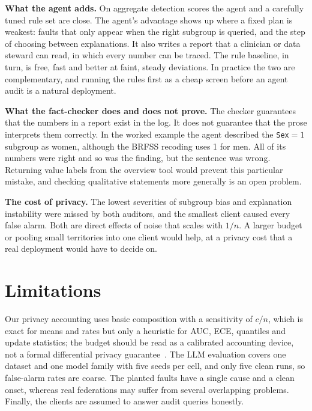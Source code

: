 \documentclass[conference]{IEEEtran}
\begin{document}
\textbf{What the agent adds.} On aggregate detection scores the agent and a carefully tuned rule
set are close. The agent's advantage shows up where a fixed plan is weakest: faults that only appear
when the right subgroup is queried, and the step of choosing between explanations. It also writes a
report that a clinician or data steward can read, in which every number can be traced. The rule
baseline, in turn, is free, fast and better at faint, steady deviations. In practice the two are
complementary, and running the rules first as a cheap screen before an agent audit is a natural
deployment.

\textbf{What the fact-checker does and does not prove.} The checker guarantees that the numbers in
a report exist in the log. It does not guarantee that the prose interprets them correctly. In the
worked example the agent described the \texttt{Sex}$=1$ subgroup as women, although the BRFSS
recoding uses 1 for men. All of its numbers were right and so was the finding, but the sentence was
wrong. Returning value labels from the overview tool would prevent this particular mistake, and
checking qualitative statements more generally is an open problem.

\textbf{The cost of privacy.} The lowest severities of subgroup bias and explanation instability
were missed by both auditors, and the smallest client caused every false alarm. Both are direct
effects of noise that scales with $1/n$. A larger budget or pooling small territories into one
client would help, at a privacy cost that a real deployment would have to decide on.

\section{Limitations}

Our privacy accounting uses basic composition with a sensitivity of $c/n$, which is exact for means
and rates but only a heuristic for AUC, ECE, quantiles and update statistics; the budget should be
read as a calibrated accounting device, not a formal differential privacy
guarantee~\cite{dwork2014algorithmic,abadi2016dpsgd}. The LLM evaluation covers one dataset and one
model family with five seeds per cell, and only five clean runs, so false-alarm rates are coarse.
The planted faults have a single cause and a clean onset, whereas real federations may suffer from
several overlapping problems. Finally, the clients are assumed to answer audit queries honestly.
\end{document}
